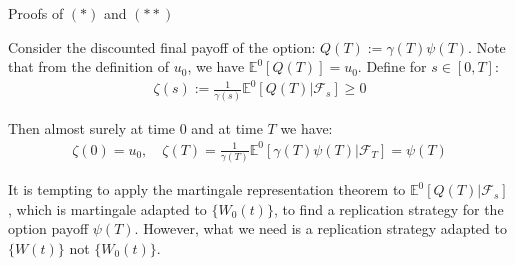\documentclass{beamer}
\begin{document}
\begin{frame}{Proofs of $(*)$ and $(**)$}

    {\footnotesize \footnotesize
    \par Consider the discounted final payoff of the option: $ Q(T) := \gamma(T)\psi(T)$. Note that from 
    the definition of $u_0$, we have $\mathbb{E}^0[Q(T)] = u_0$. Define for $s \in [0, T]$:
    \begin{align*}
        \zeta(s) := \frac{1}{\gamma(s)}\mathbb{E}^0[Q(T) | \mathcal{F}_s] \geq 0
    \end{align*}
    \par  \pause Then almost surely at time 0 and at time $T$ we have:
    \begin{align*}
        \zeta(0) = u_0, \quad \zeta(T) = \frac{1}{\gamma(T)}\mathbb{E}^0[\gamma(T)\psi(T) | \mathcal{F}_T] = \psi(T)
    \end{align*}
    \par It is tempting to apply the martingale representation theorem to $\mathbb{E}^0[Q(T) | \mathcal{F}_s]$, 
    which is martingale adapted to $\{W_0(t)\}$, to find a replication strategy for the option payoff $\psi(T)$.
     However, what we need is a replication strategy adapted to $\{W(t)\}$ not $\{W_0(t)\}$.
    }

\end{frame}
\end{document}
